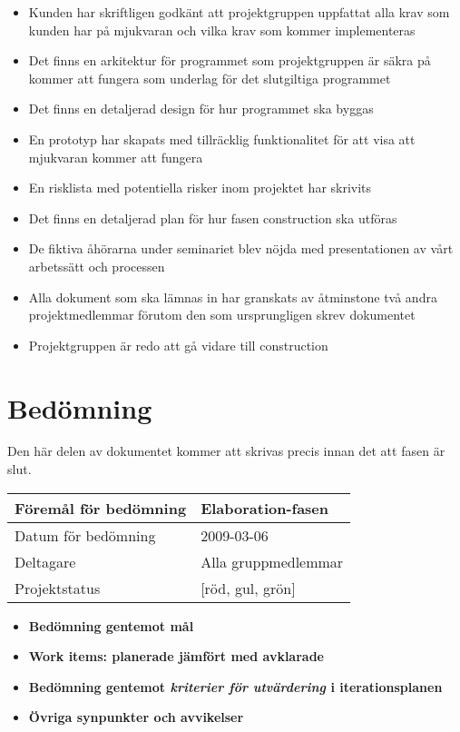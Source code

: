 \begin{itemize}
	\item Kunden har skriftligen godkänt att projektgruppen uppfattat alla krav som kunden har på mjukvaran och vilka krav som kommer implementeras 
	\item Det finns en arkitektur för programmet som projektgruppen är säkra på kommer att fungera som underlag för det slutgiltiga programmet
	\item Det finns en detaljerad design för hur programmet ska byggas
	\item En prototyp har skapats med tillräcklig funktionalitet för att visa att mjukvaran kommer att fungera
	\item En risklista med potentiella risker inom projektet har skrivits
	\item Det finns en detaljerad plan för hur fasen construction ska utföras
	\item De fiktiva åhörarna under seminariet blev nöjda med presentationen av vårt arbetssätt och processen
	\item Alla dokument som ska lämnas in har granskats av åtminstone två andra projektmedlemmar förutom den som ursprungligen skrev dokumentet
	\item Projektgruppen är redo att gå vidare till construction
\end{itemize}

\section{Bedömning}
Den här delen av dokumentet kommer att skrivas precis innan det att fasen är slut.

\begin{center}
	\begin{tabular}{| l | l |}
		\hline Föremål för bedömning & Elaboration-fasen \\
		\hline Datum för bedömning & 2009-03-06 \\
		\hline Deltagare & Alla gruppmedlemmar \\
		\hline Projektstatus & [röd, gul, grön] \\
		\hline
	\end{tabular}
\end{center}

\begin{itemize}
	\item \textbf{Bedömning gentemot mål}
	\item \textbf{Work items: planerade jämfört med avklarade}
	\item \textbf{Bedömning gentemot \textit{kriterier för utvärdering} i iterationsplanen}	
	\item \textbf{Övriga synpunkter och avvikelser}
\end{itemize}



